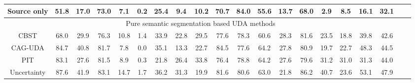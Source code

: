 \documentclass{bmvc2k}
\begin{document}
\begin{table*}[t]
{\begin{tabular}{llllllllllllllllllll}
\hline
\multicolumn{1}{c|}{Source only} & \multicolumn{1}{c}{51.8} & \multicolumn{1}{c}{17.0} & \multicolumn{1}{c}{73.0} & \multicolumn{1}{c}{7.1} & \multicolumn{1}{c}{0.2} & \multicolumn{1}{c}{25.4} & \multicolumn{1}{c}{9.4} & \multicolumn{1}{c}{10.2} & \multicolumn{1}{c}{70.7} & \multicolumn{1}{c}{84.0} & \multicolumn{1}{c}{55.6} & \multicolumn{1}{c}{13.7} & \multicolumn{1}{c}{68.0} & \multicolumn{1}{c}{2.9} & \multicolumn{1}{c}{8.5} & \multicolumn{1}{c|}{16.1} &  \multicolumn{1}{c}{32.1} \\
\hline
\multicolumn{18}{c}{Pure semantic segmentation based UDA methods} &  \\
\hline
\multicolumn{1}{c|}{CBST\cite{zou2018domain}} & \multicolumn{1}{c}{68.0} & \multicolumn{1}{c}{29.9} & \multicolumn{1}{c}{76.3} & \multicolumn{1}{c}{10.8} & \multicolumn{1}{c}{1.4} & \multicolumn{1}{c}{33.9} & \multicolumn{1}{c}{22.8} & \multicolumn{1}{c}{29.5} & \multicolumn{1}{c}{77.6} & \multicolumn{1}{c}{78.3} & \multicolumn{1}{c}{60.6} & \multicolumn{1}{c}{28.3} & \multicolumn{1}{c}{81.6} & \multicolumn{1}{c}{23.5} & \multicolumn{1}{c}{18.8} & \multicolumn{1}{c|}{39.8} & \multicolumn{1}{c}{42.6} \\
\multicolumn{1}{c|}{CAG-UDA\cite{zhang2019category}} & \multicolumn{1}{c}{84.7} & \multicolumn{1}{c}{40.8} & \multicolumn{1}{c}{81.7} & \multicolumn{1}{c}{7.8} & \multicolumn{1}{c}{0.0} & \multicolumn{1}{c}{35.1} & \multicolumn{1}{c}{13.3} & \multicolumn{1}{c}{22.7} & \multicolumn{1}{c}{84.5} & \multicolumn{1}{c}{77.6} & \multicolumn{1}{c}{64.2} & \multicolumn{1}{c}{27.8} & \multicolumn{1}{c}{80.9} & \multicolumn{1}{c}{19.7} & \multicolumn{1}{c}{22.7} & \multicolumn{1}{c|}{48.3} &  \multicolumn{1}{c}{44.5} \\
\multicolumn{1}{c|}{PIT\cite{lv2020pit}} & \multicolumn{1}{c}{83.1} & \multicolumn{1}{c}{27.6} & \multicolumn{1}{c}{81.5} & \multicolumn{1}{c}{8.9} & \multicolumn{1}{c}{0.3} & \multicolumn{1}{c}{21.8} & \multicolumn{1}{c}{26.4} & \multicolumn{1}{c}{33.8} & \multicolumn{1}{c}{76.4} & \multicolumn{1}{c}{78.8} & \multicolumn{1}{c}{64.2} & \multicolumn{1}{c}{27.6} & \multicolumn{1}{c}{79.6} & \multicolumn{1}{c}{31.2} & \multicolumn{1}{c}{31.0} & \multicolumn{1}{c|}{31.3} &  \multicolumn{1}{c}{44.0} \\
\multicolumn{1}{c|}{Uncertainty\cite{zheng2020rectifying}} & \multicolumn{1}{c}{87.6} & \multicolumn{1}{c}{41.9} & \multicolumn{1}{c}{83.1} & \multicolumn{1}{c}{14.7} & \multicolumn{1}{c}{1.7} & \multicolumn{1}{c}{36.2} & \multicolumn{1}{c}{31.3} & \multicolumn{1}{c}{19.9} & \multicolumn{1}{c}{81.6} & \multicolumn{1}{c}{80.6} & \multicolumn{1}{c}{63.0} & \multicolumn{1}{c}{21.8} & \multicolumn{1}{c}{86.2} & \multicolumn{1}{c}{40.7} & \multicolumn{1}{c}{23.6} & \multicolumn{1}{c|}{53.1} &  \multicolumn{1}{c}{47.9} \\

\end{tabular}}
\end{table*}
\end{document}
